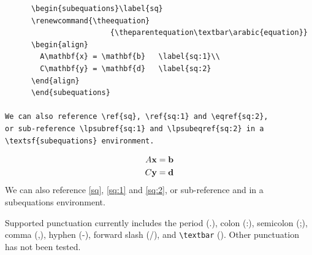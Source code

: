 \documentclass{article}
\begin{document}
\begin{tcolorbox}
  \begin{Verbatim}
	  \begin{subequations}\label{sq}
	  \renewcommand{\theequation}
	  					{\theparentequation\textbar\arabic{equation}}
	  \begin{align}
	    A\mathbf{x} = \mathbf{b}   \label{sq:1}\\
	    C\mathbf{y} = \mathbf{d}   \label{sq:2}
	  \end{align}
	  \end{subequations}

We can also reference \ref{sq}, \ref{sq:1} and \eqref{sq:2},
or sub-reference \lpsubref{sq:1} and \lpsubeqref{sq:2} in a 
\textsf{subequations} environment.

  \end{Verbatim}
\tcblower
    \begin{subequations}\label{sq}
	  \renewcommand{\theequation}
  	  								{\theparentequation\textbar\arabic{equation}}
    \begin{align}
      A\mathbf{x} = \mathbf{b}   \label{sq:1}\\
      C\mathbf{y} = \mathbf{d}   \label{sq:2}
    \end{align}
    \end{subequations}
We can also reference \ref{sq}, \ref{sq:1} and \eqref{sq:2}, or sub-reference  and  in a \textsf{subequations} environment.
\end{tcolorbox}
Supported punctuation currently includes the period (.), colon (:), semicolon (;), comma (,), hyphen (-), forward slash (/), and \verb|\textbar| (\textbar). Other punctuation has not been tested.
\end{document}
